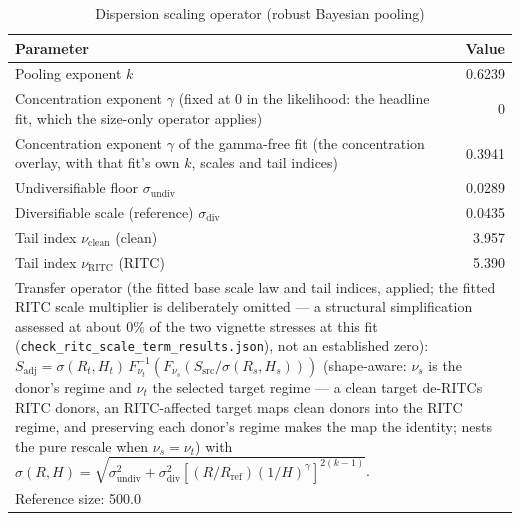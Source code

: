 \begin{table}[htbp]
\centering
\caption{Dispersion scaling operator (robust Bayesian pooling)}
\label{tab:combined_model}
\begin{tabular}{lr}
\toprule
\textbf{Parameter} & \textbf{Value} \\
\midrule
Pooling exponent $k$ & 0.6239 \\
Concentration exponent $\gamma$ (fixed at 0 in the likelihood: the headline fit, which the size-only operator applies) & 0 \\
Concentration exponent $\gamma$ of the gamma-free fit (the concentration overlay, with that fit's own $k$, scales and tail indices) & 0.3941 \\
Undiversifiable floor $\sigma_{\text{undiv}}$ & 0.0289 \\
Diversifiable scale (reference) $\sigma_{\text{div}}$ & 0.0435 \\
Tail index $\nu_{\text{clean}}$ (clean) & 3.957 \\
Tail index $\nu_{\text{RITC}}$ (RITC) & 5.390 \\
\midrule
\multicolumn{2}{p{11cm}}{Transfer operator (the fitted base scale law and tail indices, applied; the fitted RITC scale multiplier is deliberately omitted --- a structural simplification assessed at about $0\%$ of the two vignette stresses at this fit (\texttt{check\_ritc\_scale\_term\_results.json}), not an established zero): $S_{\mathrm{adj}} = \sigma(R_t,H_t)\,F^{-1}_{\nu_t}(F_{\nu_s}(S_{\mathrm{src}}/\sigma(R_s,H_s)))$ (shape-aware: $\nu_s$ is the donor's regime and $\nu_t$ the selected target regime --- a clean target de-RITCs RITC donors, an RITC-affected target maps clean donors into the RITC regime, and preserving each donor's regime makes the map the identity; nests the pure rescale when $\nu_s=\nu_t$) with $\sigma(R,H)=\sqrt{\sigma_{\text{undiv}}^2+\sigma_{\text{div}}^2[(R/R_{\text{ref}})(1/H)^{\gamma}]^{2(k-1)}}$.} \\
\multicolumn{2}{l}{Reference size: 500.0} \\
\bottomrule
\end{tabular}
\end{table}
